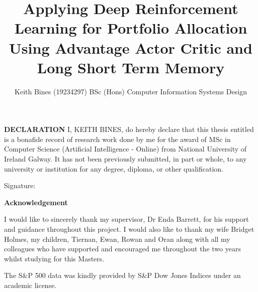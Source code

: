\documentclass[oneside,12pt]{Classes/RoboticsLaTeX}
\title{\Large{Applying Deep Reinforcement Learning for Portfolio Allocation
Using Advantage Actor Critic and Long Short Term Memory}}
\author{Keith Bines (19234297) 
  BSc (Hons) Computer Information Systems Design}
\begin{document}
\begin{spacing}{1}
\maketitle
\end{spacing}


\setcounter{secnumdepth}{3}
\setcounter{tocdepth}{3}

\frontmatter
\textbf{DECLARATION} 
I, KEITH BINES, do hereby declare that this thesis entitled  is a bonafide record of research work done by me for the award of MSc in Computer Science (Artificial Intelligence - Online) from National University of Ireland Galway. It has not been previously submitted, in part or whole, to any university or institution for any degree, diploma, or other qualification. 
\newline

Signature: 


\newpage


\textbf{Acknowledgement}

I would like to sincerely thank my supervisor, Dr Enda Barrett, for his support and guidance throughout this project. I would also like to thank my wife Bridget Holmes, my children, Tiernan, Ewan, Rowan and Oran along with all my colleagues who have supported and encouraged me throughout the two years whilst studying for this Masters.

The S\&P 500 data was kindly provided by S\&P Dow Jones Indices under an academic license.
\end{document}
